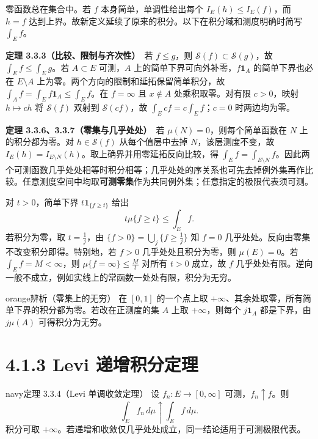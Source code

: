\documentclass[11pt,a4paper]{article}
\begin{document}
零函数总在集合中。若 \(f\) 本身简单，单调性给出每个
\(I_E(h)\le I_E(f)\)，而 \(h=f\)
达到上界。故新定义延续了原来的积分。以下在积分域和测度明确时简写
\(\int_E f\)。

\textbf{定理 3.3.3（比较、限制与齐次性）}　若 \(f\le g\)，则
\(\mathcal S(f)\subset\mathcal S(g)\)，故 \(\int_E f\le\int_E g\)。若
\(A\subset E\) 可测，\(A\) 上的简单下界可向外补零，\(f\mathbf1_A\)
的简单下界也必在 \(E\setminus A\)
上为零。两个方向的限制和延拓保留简单积分，故
\(\int_A f=\int_E f\mathbf1_A\le\int_E f\)。在 \(f=\infty\) 且
\(x\notin A\) 处乘积取零。对有限 \(c>0\)，映射 \(h\mapsto ch\) 将
\(\mathcal S(f)\) 双射到 \(\mathcal S(cf)\)，故
\(\int_E cf=c\int_E f\)；\(c=0\) 时两边均为零。

\textbf{定理 3.3.6、3.3.7（零集与几乎处处）}　若
\(\mu(N)=0\)，则每个简单函数在 \(N\) 上的积分都为零。对
\(h\in\mathcal S(f)\) 从每个值层中去掉 \(N\)，该层测度不变，故
\(I_E(h)=I_{E\setminus N}(h)\)。取上确界并用零延拓反向比较，得
\(\int_E f=\int_{E\setminus N} f\)。因此两个可测函数几乎处处相等时积分相等；几乎处处的序关系也可先去掉例外集再作比较。任意测度空间中均取\textbf{可测零集}作为共同例外集；任意指定的极限代表须可测。

对 \(t>0\)，简单下界 \(t\mathbf1_{\{f\ge t\}}\) 给出 \begin{equation*}
t\mu\{f\ge t\}\le\int_E f.\tag{4.1.2}
\end{equation*} 若积分为零，取 \(t=\frac1j\)，由 \(\{f>0\}=\bigcup_j\{f\ge\frac1j\}\)
知 \(f=0\) 几乎处处。反向由零集不改变积分即得。特别地，若 \(f>0\)
几乎处处且积分为零，则 \(\mu(E)=0\)。若 \(\int_E f=M<\infty\)，则
\(\mu\{f=\infty\}\le \frac Mt\) 对所有 \(t>0\) 成立，故 \(f\)
几乎处处有限。逆向一般不成立，例如实线上的常函数一处处有限，积分为无穷。

\begin{sboxenv}{orange}{辨析（零集上的无穷）}
在 \([0,1]\) 的一个点上取
\(+\infty\)、其余处取零，所有简单下界的积分都为零。若改在正测度的集
\(A\) 上取 \(+\infty\)，则每个 \(j\mathbf1_A\) 都是下界，由 \(j\mu(A)\)
可得积分为无穷。

\end{sboxenv}

\clearpage\section[\S{}4.1.3 Levi
递增积分定理]{4.1.3 Levi
递增积分定理}\label{levi-ux9012ux589eux79efux5206ux5b9aux7406}

\begin{sboxenv}{navy}{定理 3.3.4（Levi 单调收敛定理）}
设 \(f_n:E\to[0,\infty]\) 可测，\(f_n\uparrow f\)。则 \begin{equation*}
\int_E f_n\,d\mu\uparrow\int_E f\,d\mu .\tag{4.1.3}
\end{equation*} 积分可取
\(+\infty\)。若递增和收敛仅几乎处处成立，同一结论适用于可测极限代表。

\end{sboxenv}
\end{document}
